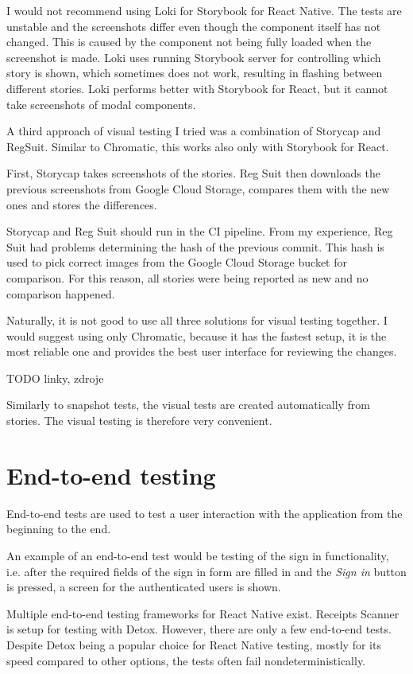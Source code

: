 \documentclass[
  digital, %
  table,   %
  oneside, %
  lof,     %
  lot,     %
]{fithesis3}
\begin{document}
I would not recommend using Loki for Storybook for React Native. The tests are unstable and the screenshots differ even though the component itself has not changed. This is caused by the component not being fully loaded when the screenshot is made. Loki uses running Storybook server for controlling which story is shown, which sometimes does not work, resulting in flashing between different stories.
Loki performs better with Storybook for React, but it cannot take screenshots of modal components.

A third approach of visual testing I tried was a combination of Storycap and RegSuit. Similar to Chromatic, this works also only with Storybook for React.

First, Storycap takes screenshots of the stories. Reg Suit then downloads the previous screenshots from Google Cloud Storage, compares them with the new ones and stores the differences. 

Storycap and Reg Suit should run in the CI pipeline. From my experience, Reg Suit had problems determining the hash of the previous commit. This hash is used to pick correct images from the Google Cloud Storage bucket for comparison. For this reason, all stories were being reported as new and no comparison happened.

Naturally, it is not good to use all three solutions for visual testing together. I would suggest using only Chromatic, because it has the fastest setup, it is the most reliable one and provides the best user interface for reviewing the changes.

TODO linky, zdroje

Similarly to snapshot tests, the visual tests are created automatically from stories. The visual testing is therefore very convenient.

\section{End-to-end testing}
End-to-end tests are used to test a user interaction with the application from the beginning to the end. 

An example of an end-to-end test would be testing of the sign in functionality, i.e. after the required fields of the sign in form are filled in and the \textit{Sign in} button is pressed, a screen for the authenticated users is shown.

Multiple end-to-end testing frameworks for React Native exist.
Receipts Scanner is setup for testing with Detox. However, there are only a few end-to-end tests. Despite Detox being a popular choice for React Native testing, mostly for its speed compared to other options, the tests often fail nondeterministically.
\end{document}
